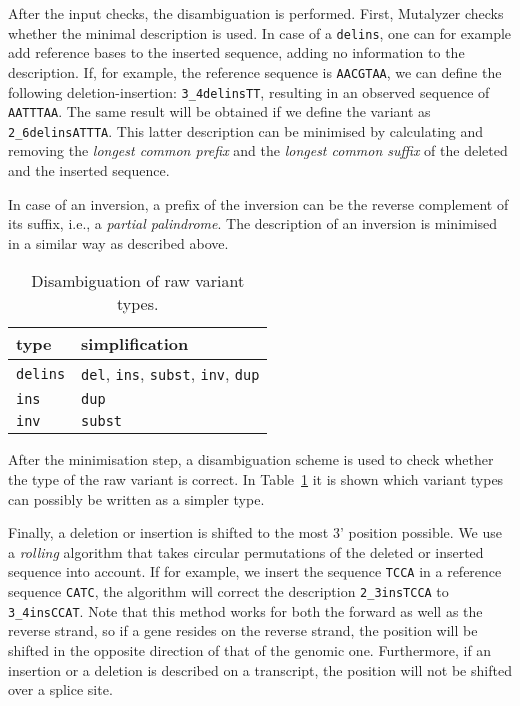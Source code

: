 \documentclass{article}
\begin{document}
After the input checks, the disambiguation is performed. First, Mutalyzer
checks whether the minimal description is used. In case of a \texttt{delins},
one can for example add reference bases to the inserted sequence, adding no
information to the description. If, for example, the reference sequence is
\texttt{AACGTAA}, we can define the following deletion-insertion:
\texttt{3\_4delinsTT}, resulting in an observed sequence of \texttt{AATTTAA}.
The same result will be obtained if we define the variant as
\texttt{2\_6delinsATTTA}. This latter description can be minimised by
calculating and removing the \emph{longest common prefix} and the \emph{longest
common suffix} of the deleted and the inserted sequence.

In case of an inversion, a prefix of the inversion can be the reverse
complement of its suffix, i.e., a \emph{partial palindrome}. The
description of an inversion is minimised in a similar way as described above.

\begin{table}
  \caption{Disambiguation of raw variant types.}
  \label{tab:typedisambiguation}
  \begin{center}
    \begin{tabular}{l|l}
      type            & simplification\\
      \hline
      \texttt{delins} & \texttt{del}, \texttt{ins}, \texttt{subst},
        \texttt{inv}, \texttt{dup}\\
      \texttt{ins}    & \texttt{dup}\\
      \texttt{inv}    & \texttt{subst}
    \end{tabular}
  \end{center}
\end{table}

After the minimisation step, a disambiguation scheme is used to check whether
the type of the raw variant is correct. In Table~\ref{tab:typedisambiguation}
it is shown which variant types can possibly be written as a simpler type.

Finally, a deletion or insertion is shifted to the most 3' position possible.
We use a \emph{rolling} algorithm that takes circular permutations of the
deleted  or inserted sequence into account. If for example, we insert the
sequence \texttt{TCCA} in a reference sequence \texttt{CATC}, the
algorithm will correct the description \texttt{2\_3insTCCA} to
\texttt{3\_4insCCAT}. Note that this method works for both the forward as well
as the reverse strand, so if a gene resides on the reverse strand, the position
will be shifted in the opposite direction of that of the genomic one.
Furthermore, if an insertion or a deletion is described on a transcript, the
position will not be shifted over a splice site.
\end{document}
